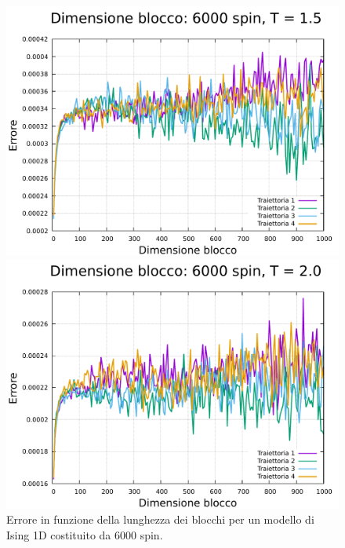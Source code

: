 \begin{figure}[htbp]
    \begin{minipage}{0.45\textwidth}  
      \centering
      \includegraphics[page=1, width=\textwidth]{Immagini/simIsing1D/magn0.02/lblk/err_6000_1.5.pdf}
      \caption{$T\,=\,1.5$}
    \end{minipage}\hfill
    \begin{minipage}{0.45\textwidth}  
      \centering
      \includegraphics[page=1, width=\textwidth]{Immagini/simIsing1D/magn0.02/lblk/err_6000_2.0.pdf}
      \caption{$T\,=\,2.0$}
    \end{minipage}
    \caption{Errore in funzione della lunghezza dei blocchi per un modello di Ising 1D costituito da 6000 spin.}
\end{figure}

